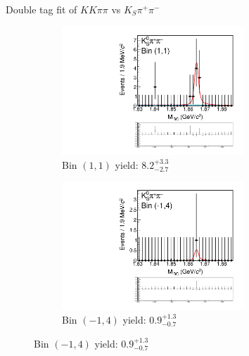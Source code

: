 \documentclass{beamer}
\begin{document}
\begin{frame}{Double tag fit of $KK\pi\pi$ vs $K_S\pi^+\pi^-$}
  \begin{figure}
    \centering
    \begin{subfigure}{0.5\textwidth}
      \centering
      \includegraphics[width=0.75\textwidth,trim={0 5cm 0 0},clip=true]{Plots/DoubleTagYield_DoubleTag_SCMB_KKpipi_vs_KSpipi_SignalBinP1_TagBin1.pdf}
      \caption{Bin $(1, 1)$ yield: $8.2_{-2.7}^{+3.3}$}
    \end{subfigure}%
    \begin{subfigure}{0.5\textwidth}
      \centering
      \includegraphics[width=0.75\textwidth,trim={0 5cm 0 0},clip=true]{Plots/DoubleTagYield_DoubleTag_SCMB_KKpipi_vs_KSpipi_SignalBinM1_TagBin4.pdf}
      \caption{Bin $(-1, 4)$ yield: $0.9_{-0.7}^{+1.3}$}
    \end{subfigure}
  \end{figure}
\end{frame}
\end{document}
